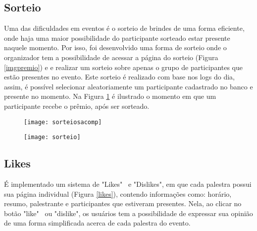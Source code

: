 \documentclass[tcc,capa]{texufpel}
\begin{document}
        
        \subsection{Sorteio}
        
            Uma das dificuldades em eventos é o sorteio de brindes de uma forma eficiente, onde haja uma maior possibilidade do participante sorteado estar presente naquele momento. Por isso, foi desenvolvido uma forma de sorteio onde o organizador tem a possibilidade de acessar a página do sorteio (Figura \ref{imgpremio}) e e realizar um sorteio sobre apenas o grupo de participantes que estão presentes no evento.
            Este sorteio é realizado com base nos logs do dia, assim, é possível selecionar aleatoriamente um participante cadastrado no banco e presente no momento. Na Figura \ref{imgpremio2} é ilustrado o momento em que um participante recebe o prêmio, após ser sorteado.
            
            \begin{figure}[H]
                \centering
                \begin{minipage}{.45\linewidth}
                  \texttt{[image: sorteiosacomp]}
                  \label{imgpremio}
                \end{minipage}
                \hspace{.05\linewidth}
                \begin{minipage}{.40\linewidth}
                  \texttt{[image: sorteio]}
                  \label{imgpremio2}
                \end{minipage}
            \end{figure}
    
    
    
        \subsection{Likes}
        
            É implementado um sistema de "Likes"~ e "Dislikes", em que cada palestra possui sua página individual (Figura \ref{likes}), contendo informações como: horário, resumo, palestrante e participantes que estiveram presentes. Nela, ao clicar no botão "like"~ ou "dislike", os usuários tem a possibilidade de expressar sua opinião de uma forma simplificada acerca de cada palestra do evento.
            
\end{document}
